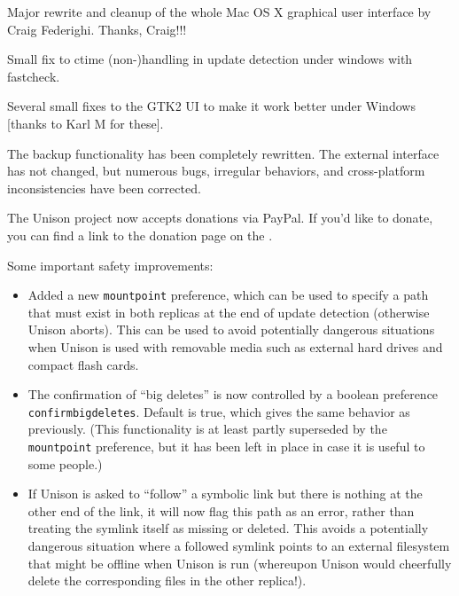 \begin{changesfromversion}{2.17}
\item Major rewrite and cleanup of the whole Mac OS X graphical user
interface by Craig Federighi.  Thanks, Craig!!!
\item Small fix to ctime (non-)handling in update detection under windows
  with fastcheck.
\item Several small fixes to the GTK2 UI to make it work better under
Windows [thanks to Karl M for these].
\item The backup functionality has been completely rewritten.  The external
interface has not changed, but numerous bugs, irregular behaviors, and
cross-platform inconsistencies have been corrected.
\item The Unison project now accepts donations via PayPal.  If you'd like to
donate, you can find a link to the donation page on the
.
\item Some important safety improvements:
\begin{itemize}
\item Added a new \verb|mountpoint| preference, which can be used to specify
a path that must exist in both replicas at the end of update detection
(otherwise Unison aborts).  This can be used to avoid potentially dangerous
situations when Unison is used with removable media such as external hard
drives and compact flash cards.
\item The confirmation of ``big deletes'' is now controlled by a boolean preference
  \verb|confirmbigdeletes|.  Default is true, which gives the same behavior as
  previously.  (This functionality is at least partly superseded by the
  \verb|mountpoint| preference, but it has been left in place in case it is
  useful to some people.)
  \item If Unison is asked to ``follow'' a symbolic link but there is
  nothing at the other end of the link, it will now flag this path as an
  error, rather than treating the symlink itself as missing or deleted.
  This avoids a potentially dangerous situation where a followed symlink
  points to an external filesystem that might be offline when Unison is run
  (whereupon Unison would cheerfully delete the corresponding files in the
  other replica!).
\end{itemize}


\end{changesfromversion}
